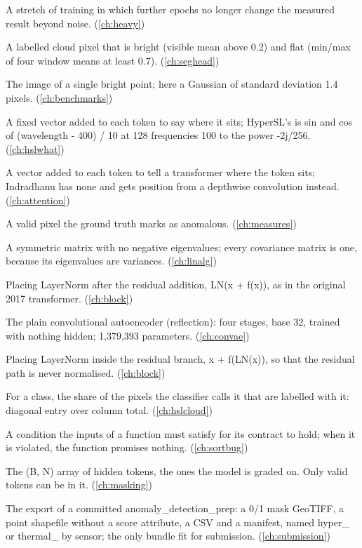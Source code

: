\begin{description}[style=nextline,leftmargin=1.2em,font=\normalfont\bfseries]
\item[Plateau] A stretch of training in which further epochs no longer change the measured result beyond noise. (\cref{ch:heavy})
\item[Plausible cloud] A labelled cloud pixel that is bright (visible mean above 0.2) and flat (min/max of four window means at least 0.7). (\cref{ch:seghead})
\item[Point-spread function (PSF)] The image of a single bright point; here a Gaussian of standard deviation 1.4 pixels. (\cref{ch:benchmarks})
\item[Position code] A fixed vector added to each token to say where it sits; HyperSL's is sin and cos of (wavelength - 400) / 10 at 128 frequencies 100 to the power -2j/256. (\cref{ch:hslwhat})
\item[Positional encoding] A vector added to each token to tell a transformer where the token sits; Indradhanu has none and gets position from a depthwise convolution instead. (\cref{ch:attention})
\item[Positive (target)] A valid pixel the ground truth marks as anomalous. (\cref{ch:measures})
\item[Positive semi-definite] A symmetric matrix with no negative eigenvalues; every covariance matrix is one, because its eigenvalues are variances. (\cref{ch:linalg})
\item[Post-norm] Placing LayerNorm after the residual addition, LN(x + f(x)), as in the original 2017 transformer. (\cref{ch:block})
\item[Pratibimba] The plain convolutional autoencoder (reflection): four stages, base 32, trained with nothing hidden; 1,379,393 parameters. (\cref{ch:convae})
\item[Pre-norm] Placing LayerNorm inside the residual branch, x + f(LN(x)), so that the residual path is never normalised. (\cref{ch:block})
\item[Precision] For a class, the share of the pixels the classifier calls it that are labelled with it: diagonal entry over column total. (\cref{ch:hslcloud})
\item[Precondition] A condition the inputs of a function must satisfy for its contract to hold; when it is violated, the function promises nothing. (\cref{ch:sortbug})
\item[Prediction mask] The (B, N) array of hidden tokens, the ones the model is graded on. Only valid tokens can be in it. (\cref{ch:masking})
\item[Prep bundle] The export of a committed anomaly\_detection\_prep: a 0/1 mask GeoTIFF, a point shapefile without a score attribute, a CSV and a manifest, named hyper\_ or thermal\_ by sensor; the only bundle fit for submission. (\cref{ch:submission})

\end{description}
